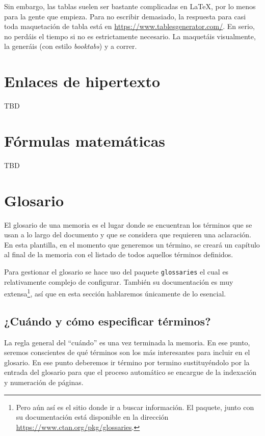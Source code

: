 Sin embargo, las tablas suelen ser bastante complicadas en \LaTeX, por lo menos para la gente que empieza. Para no escribir demasiado, la respuesta para casi toda maquetación de tabla está en \href{https://www.tablesgenerator.com/}{https://www.tablesgenerator.com/}. En serio, no perdáis el tiempo si no es estrictamente necesario. La maquetáis visualmente, la generáis (con estilo \textit{booktabs}) y a correr.

\section{Enlaces de hipertexto}

TBD

\section{Fórmulas matemáticas}

TBD

\section{Glosario}
\label{s:glosario}

El glosario de una memoria es el lugar donde se encuentran los términos que se usan a lo largo del documento y que se considera que requieren una aclaración. En esta plantilla, en el momento que generemos un término, se creará un capítulo al final de la memoria con el listado de todos aquellos términos definidos.

Para gestionar el glosario se hace uso del paquete \texttt{glossaries} el cual es relativamente complejo de configurar. También su documentación es muy extensa\footnote{Pero aún así es el sitio donde ir a buscar información. El paquete, junto con su documentación está disponible en la dirección \href{https://www.ctan.org/pkg/glossaries}{https://www.ctan.org/pkg/glossaries}.}, así que en esta sección hablaremos únicamente de lo esencial.

\subsection{¿Cuándo y cómo especificar términos?}

La regla general del \enquote{cuándo} es una vez terminada la memoria. En ese punto, seremos conscientes de qué términos son los más interesantes para incluir en el glosario. En ese punto deberemos ir término por termino sustituyéndolo por la entrada del glosario para que el proceso automático se encargue de la indexación y numeración de páginas.

